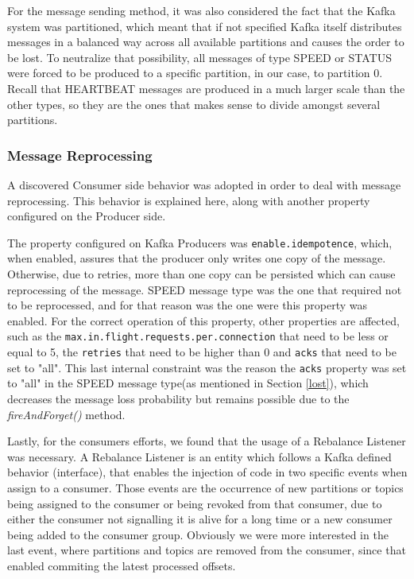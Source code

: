 \documentclass[12pt]{article}
\begin{document}
For the message sending method, it was also considered the fact that the Kafka system was partitioned, which meant that if not specified Kafka itself distributes 
messages in a balanced way across all available partitions and causes the order to be lost. 
To neutralize that possibility, all messages of type SPEED or STATUS were forced to be produced to a specific partition, in our case, to partition 0.
Recall that HEARTBEAT messages are produced in a much larger scale than the other types, so they are the ones that makes sense to divide amongst several partitions.

\subsubsection{Message Reprocessing}\label{reprocessing}

A discovered Consumer side behavior was adopted in order to deal with message reprocessing.
This behavior is explained here, along with another property configured on the Producer side.

The property configured on Kafka Producers was \texttt{enable.idempotence}, which, when enabled, assures that the producer only writes one copy of the message. 
Otherwise, due to retries, more than one copy can be persisted which can cause reprocessing of the message. 
SPEED message type was the one that required not to be reprocessed, and for that reason was the one were this property was enabled. 
For the correct operation of this property, other properties are affected, such as the \texttt{max.in.flight.requests.per.connection} that need to be less or 
equal to 5, the \texttt{retries} that need to be higher than 0 and \texttt{acks} that need to be set to "all". 
This last internal constraint was the reason the \texttt{acks} property was set to "all" in the SPEED message type(as mentioned in Section \ref{lost}), which 
decreases the message loss probability but remains possible due to the \textit{fireAndForget()} method.

Lastly, for the consumers efforts, we found that the usage of a Rebalance Listener was necessary. 
A Rebalance Listener is an entity which follows a Kafka defined behavior (interface), that enables the injection of code in two specific events when assign to a consumer. 
Those events are the occurrence of new partitions or topics being assigned to the consumer or being revoked from that consumer, due to either the consumer not 
signalling it is alive for a long time or a new consumer being added to the consumer group. 
Obviously we were more interested in the last event, where partitions and topics are removed from the consumer, since that enabled commiting the latest processed offsets.
\end{document}
